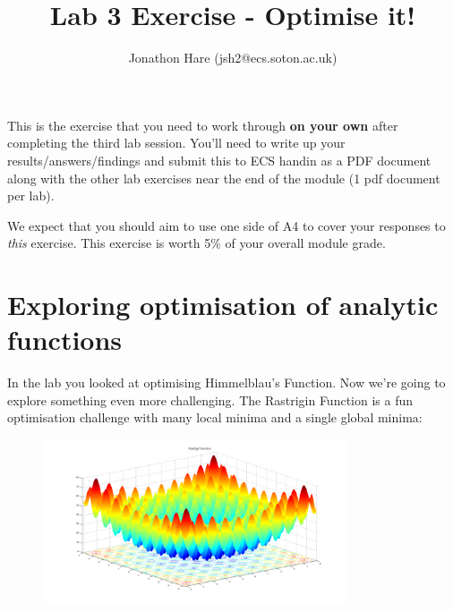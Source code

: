 \documentclass[a4paper]{article}
\begin{document}
\lstset{language=Python,upquote=true}

\setlength{\leftskip}{20pt}
\title{Lab 3 Exercise - Optimise it!}
\author{Jonathon Hare (jsh2@ecs.soton.ac.uk)}

\maketitle


This is the exercise that you need to work through \textbf{on your own} after completing the third lab session. You'll need to write up your results/answers/findings and submit this to ECS handin as a PDF document along with the other lab exercises near the end of the module (1 pdf document per lab). 

We expect that you should aim to use one side of A4 to cover your responses to \emph{this} exercise. This exercise is worth 5\% of your overall module grade.

\section{Exploring optimisation of analytic functions}\label{analytic}
In the lab you looked at optimising Himmelblau's Function. Now we're going to explore something even more challenging. The Rastrigin Function is a fun optimisation challenge with many local minima and a single global minima:

\begin{figure}[h!]
	\center
	\includegraphics[width=0.8\textwidth]{Rastrigin_function.png}
\end{figure}
\end{document}
